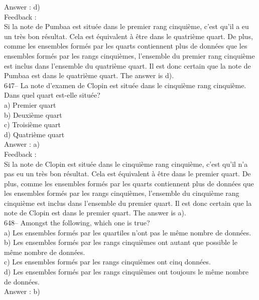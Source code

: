 ﻿\documentclass[letterpaper, 12pt]{article}
\begin{document}
Answer : d)\\

Feedback : \\
Si la note de Pumbaa est situ\'ee dans le premier rang cinqui\`eme, c'est
qu'il a eu un tr\`es bon r\'esultat.  Cela est \'equivalent \`a \^etre dans
le quatri\`eme quart.  De plus, comme les ensembles form\'es par les quarts
contiennent plus de donn\'ees que les ensembles form\'es par les rangs
cinqui\`emes, l'ensemble du premier rang cinqui\`eme est inclus dans
l'ensemble du quatri\`eme quart.  Il est donc certain que la note de Pumbaa
est dans le quatri\`eme quart.  The answer is d).\\

647-- La note d'examen de Clopin est situ\'ee dans le cinqui\`eme rang
cinqui\`eme.  Dans quel quart est-elle situ\'ee?\\
a) Premier quart\\
b) Deuxi\`eme quart\\
c) Troisi\`eme quart\\
d) Quatri\`eme quart\\

Answer : a)\\

Feedback : \\
Si la note de Clopin est situ\'ee dans le cinqui\`eme rang cinqui\`eme,
c'est qu'il n'a pas eu un tr\`es bon r\'esultat.  Cela est \'equivalent \`a
\^etre dans le premier quart.  De plus, comme les ensembles form\'es par les
quarts contiennent plus de donn\'ees que les ensembles form\'es par les
rangs cinqui\`emes, l'ensemble du cinqui\`eme rang cinqui\`eme est inclus
dans l'ensemble du premier quart.  Il est donc certain que la note de Clopin
est dans le premier quart.  The answer is a).\\

648-- Amongst the following, which one is true?\\
a) Les ensembles form\'es par les quartiles n'ont pas le m\^eme nombre de
donn\'ees.\\
b) Les ensembles form\'es par les rangs cinqui\`emes ont autant que possible
le m\^eme nombre de donn\'ees.\\
c) Les ensembles form\'es par les rangs cinqui\`emes ont cinq donn\'ees.\\
d) Les ensembles form\'es par les rangs cinqui\`emes ont toujours le m\^eme
nombre de donn\'ees.\\

Answer : b)\\
\end{document}
